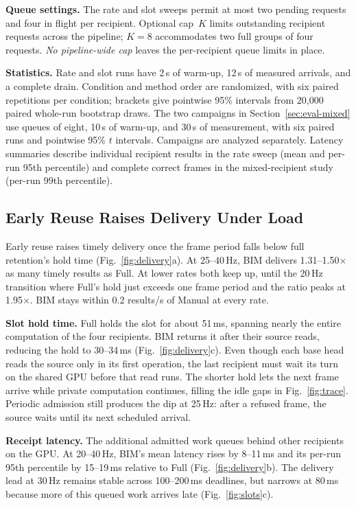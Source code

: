 \documentclass[conference]{IEEEtran}
\newcommand{\ms}{\,ms}
\newcommand{\Hz}{\,Hz}
\begin{document}
\textbf{Queue settings.} The rate and slot sweeps permit at most two pending requests and four in flight per recipient. Optional cap~$K$ limits outstanding recipient requests across the pipeline; $K{=}8$ accommodates two full groups of four requests. \emph{No pipeline-wide cap} leaves the per-recipient queue limits in place.

\textbf{Statistics.} Rate and slot runs have 2\,s of warm-up, 12\,s of measured arrivals, and a complete drain. Condition and method order are randomized, with six paired repetitions per condition; brackets give pointwise 95\% intervals from 20,000 paired whole-run bootstrap draws. The two campaigns in Section~\ref{sec:eval-mixed} use queues of eight, 10\,s of warm-up, and 30\,s of measurement, with six paired runs and pointwise 95\% $t$ intervals. Campaigns are analyzed separately. Latency summaries describe individual recipient results in the rate sweep (mean and per-run 95th percentile) and complete correct frames in the mixed-recipient study (per-run 99th percentile).

\subsection{Early Reuse Raises Delivery Under Load}
\label{sec:eval-delivery}

Early reuse raises timely delivery once the frame period falls below full retention's hold time (Fig.~\ref{fig:delivery}a). At 25--40\Hz, BIM delivers 1.31--1.50$\times$ as many timely results as Full. At lower rates both keep up, until the 20\Hz{} transition where Full's hold just exceeds one frame period and the ratio peaks at 1.95$\times$. BIM stays within 0.2 results/s of Manual at every rate.

\textbf{Slot hold time.} Full holds the slot for about 51\ms, spanning nearly the entire computation of the four recipients. BIM returns it after their source reads, reducing the hold to 30--34\ms{} (Fig.~\ref{fig:delivery}c). Even though each base head reads the source only in its first operation, the last recipient must wait its turn on the shared GPU before that read runs. The shorter hold lets the next frame arrive while private computation continues, filling the idle gaps in Fig.~\ref{fig:trace}. Periodic admission still produces the dip at 25\Hz: after a refused frame, the source waits until its next scheduled arrival.

\textbf{Receipt latency.} The additional admitted work queues behind other recipients on the GPU. At 20--40\Hz, BIM's mean latency rises by 8--11\ms{} and its per-run 95th percentile by 15--19\ms{} relative to Full (Fig.~\ref{fig:delivery}b). The delivery lead at 30\Hz{} remains stable across 100--200\ms{} deadlines, but narrows at 80\ms{} because more of this queued work arrives late (Fig.~\ref{fig:slots}c).
\end{document}
